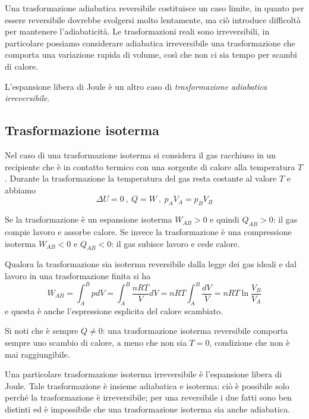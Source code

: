 \documentclass[class=book, crop=false, oneside, 12pt]{standalone}
\begin{document}
Una trasformazione adiabatica reversibile costituisce un caso limite, in quanto per essere reversibile dovrebbe svolgersi molto lentamente, ma ciò introduce difficoltà per mantenere l'adiabaticità. 
Le trasformazioni reali sono irreversibili, in particolare possiamo considerare adiabatica irreversibile una trasformazione che comporta una variazione rapida di volume, così che non ci sia tempo per scambi di calore. 

L'espansione libera di Joule è un altro caso di \emph{trasformazione adiabatica irreversibile}.

\subsection{Trasformazione isoterma}

Nel caso di una trasformazione isoterma si considera il gas racchiuso in un recipiente che è in contatto termico con una sorgente di calore alla temperatura \(T\). 
Durante la trasformazione la temperatura del gas resta costante al valore \(T\) e abbiamo
\begin{equation*}
    \Delta U = 0 \ , \ Q = W \ , \ p_A V_A = p_B V_B
\end{equation*}

Se la trasformazione è un espansione isoterma \(W_{AB}>0\) e quindi \(Q_{AB}>0\): il gas compie lavoro e assorbe calore. 
Se invece la trasformazione è una compressione isoterma \(W_{AB} < 0 \) e \(Q_{AB} < 0\): il gas subisce lavoro e cede calore.

Qualora la trasformazione sia isoterma reversibile dalla legge dei gas ideali e dal lavoro in una trasformazione finita si ha
\begin{equation}
    W_{AB} = \int_A^B p d V = \int_A^B \frac{n R T}{V} d V = n R T \int_A^B \frac{d V}{V} = n R T \ln \frac{V_{B}}{V_{A}} 
\end{equation}
e questa è anche l'espressione esplicita del calore scambiato.

Si noti che è sempre \(Q \neq 0\): una trasformazione isoterma reversibile comporta sempre uno scambio di calore, a meno che non sia \(T = 0\), condizione che non è mai raggiungibile. 

Una particolare trasformazione isoterma irreversibile è l'espansione libera di Joule. 
Tale trasformazione è insieme adiabatica e isoterma: ciò è possibile solo perché la trasformazione è irreversibile; per una reversibile i due fatti sono ben distinti ed è impossibile che una trasformazione isoterma sia anche adiabatica.
\end{document}
